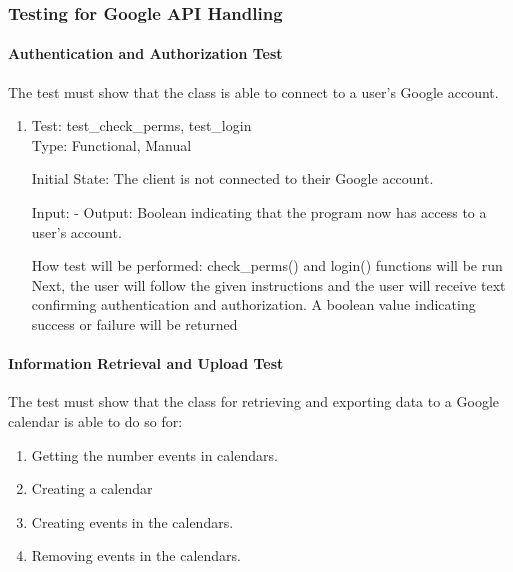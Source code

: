 \documentclass[12pt, titlepage]{article}
\begin{document}
\subsubsection{Testing for Google API Handling}

\paragraph{Authentication and Authorization Test}
The test must show that the class is able to connect to a user's Google account.
\begin{enumerate}

\color{blue}\item{Test: test\_check\_perms, test\_login\\}
\color{black}
Type: Functional, Manual
					
Initial State: The client is not connected to their Google account. 
					
Input: - 
\color{blue}					
Output: Boolean indicating that the program now has access to a user's account.
					
How test will be performed: check\_perms() and login() functions will be run
Next, the user will follow the given instructions and the user will receive text confirming authentication and authorization. A boolean value indicating success or failure will be returned
\end{enumerate}
\color{black}
\paragraph{Information Retrieval and Upload Test}

The test must show that the class for retrieving and exporting data to a Google calendar is able to do so for:
\begin{enumerate}
    \item Getting the number events in calendars.
    \item Creating a calendar
    \item Creating events in the calendars.
    \item Removing events in the calendars.
\end{enumerate}
\end{document}
